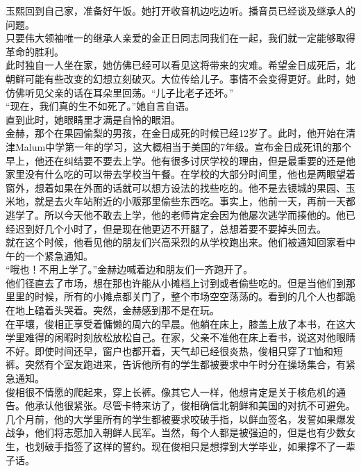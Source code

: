 玉熙回到自己家，准备好午饭。她打开收音机边吃边听。播音员已经谈及继承人的问题。\\

只要伟大领袖唯一的继承人亲爱的金正日同志同我们在一起，我们就一定能够取得革命的胜利。\\

此时独自一人坐在家，她仿佛已经可以看见这将带来的灾难。希望金日成死后，北朝鲜可能有些改变的幻想立刻破灭。大位传给儿子。事情不会变得更好。此时，她仿佛听见父亲的话在耳朵里回荡。“儿子比老子还坏。”\\

“现在，我们真的生不如死了。”她自言自语。\\

直到此时，她眼睛里才满是自怜的眼泪。\\

金赫，那个在果园偷梨的男孩，在金日成死的时候已经12岁了。此时，他开始在清津Malum中学第一年的学习，这大概相当于美国的7年级。宣布金日成死讯的那个早上，他还在纠结要不要去上学。他有很多讨厌学校的理由，但是最重要的还是他家里没有什么吃的可以带去学校当午餐。在学校的大部分时间里，他也是两眼望着窗外，想着如果在外面的话就可以想方设法的找些吃的。他不是去镜城的果园、玉米地，就是去火车站附近的小贩那里偷些东西吃。事实上，他前一天，再前一天都逃学了。所以今天他不敢去上学，他的老师肯定会因为他屡次逃学而揍他的。他已经迟到好几个小时了，但是现在他更迈不开腿了，总想着要不要掉头回去。\\

就在这个时候，他看见他的朋友们兴高采烈的从学校跑出来。他们被通知回家看中午的一个紧急通知。\\

“哦也！不用上学了。”金赫边喊着边和朋友们一齐跑开了。\\

他们径直去了市场，想在那也许能从小摊档上讨到或者偷些吃的。但是当他们到那里里的时候，所有的小摊点都关门了，整个市场空空荡荡的。看到的几个人也都跪在地上磕着头哭着。突然，金赫感到那不是在玩。\\

在平壤，俊相正享受着慵懒的周六的早晨。他躺在床上，膝盖上放了本书，在这大学里难得的闲暇时刻放松放松自己。在家，父亲不准他在床上看书，说这对他眼睛不好。即使时间还早，窗户也都开着，天气却已经很炎热，俊相只穿了T恤和短裤。突然有个室友跑进来，告诉他所有的学生都被要求中午时分在操场集合，有紧急通知。\\

俊相很不情愿的爬起来，穿上长裤。像其它人一样，他想肯定是关于核危机的通告。他承认他很紧张。尽管卡特来访了，俊相确信北朝鲜和美国的对抗不可避免。几个月前，他的大学里所有的学生都被要求咬破手指，以鲜血签名，发誓如果爆发战争，他们将志愿加入朝鲜人民军。当然，每个人都是被强迫的，但是也有少数女生，也划破手指签了这样的誓约。现在俊相只是想撑到大学毕业，如果撑不了一辈子话。\\

